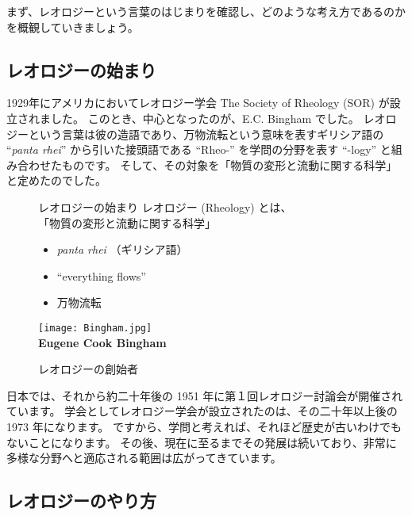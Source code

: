 \documentclass[uplatex,dvipdfmx,a4paper,11pt]{jsreport}
\begin{document}
まず、レオロジーという言葉のはじまりを確認し、どのような考え方であるのかを概観していきましょう。

\subsection{レオロジーの始まり}
1929年にアメリカにおいてレオロジー学会 The Society of Rheology (SOR) が設立されました。
このとき、中心となったのが、E.C. Bingham でした。
レオロジーという言葉は彼の造語であり、万物流転という意味を表すギリシア語の ``\textit{panta rhei}'' から引いた接頭語である ``Rheo-'' を学問の分野を表す ``-logy'' と組み合わせたものです。
そして、その対象を「物質の変形と流動に関する科学」と定めたのでした。
\begin{figure}[htb]
	\begin{center}
		\begin{minipage}{0.5\textwidth}
			\large
			\begin{itembox}[l]{レオロジーの始まり}
				レオロジー (Rheology) とは、\\
			「物質の変形と流動に関する科学」
				\begin{itemize}
					\item \textit{panta rhei} （ギリシア語）
					\item ``everything flows''
					\item 万物流転
				\end{itemize}
			\end{itembox}
		\end{minipage}
		\begin{minipage}{0.4\textwidth}
			\begin{center}
				\texttt{[image: Bingham.jpg]}\\
				\large{\bf Eugene Cook Bingham}
			\end{center}
		\end{minipage}
	\end{center}
		\caption{レオロジーの創始者}
		\label{Bingham}
\end{figure}

日本では、それから約二十年後の 1951 年に第１回レオロジー討論会が開催されています。
学会としてレオロジー学会が設立されたのは、その二十年以上後の 1973 年になります。
ですから、学問と考えれば、それほど歴史が古いわけでもないことになります。
その後、現在に至るまでその発展は続いており、非常に多様な分野へと適応される範囲は広がってきています。

\subsection{レオロジーのやり方}
\end{document}
